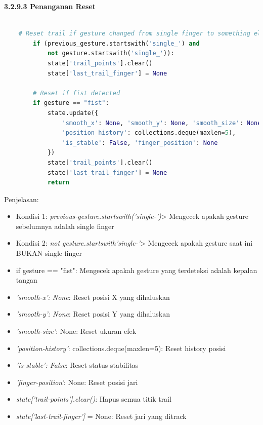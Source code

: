 \documentclass[11pt,a4paper]{article}
\begin{document}
    \noindent\textbf{3.2.9.3 Penanganan Reset}
    \begin{lstlisting}[language=Python, caption=Penanganan Reset]
        
    # Reset trail if gesture changed from single finger to something else
        if (previous_gesture.startswith('single_') and 
            not gesture.startswith('single_')):
            state['trail_points'].clear()
            state['last_trail_finger'] = None
        
        # Reset if fist detected
        if gesture == "fist":
            state.update({
                'smooth_x': None, 'smooth_y': None, 'smooth_size': None,
                'position_history': collections.deque(maxlen=5),
                'is_stable': False, 'finger_position': None
            })
            state['trail_points'].clear()
            state['last_trail_finger'] = None
            return
    \end{lstlisting}
    Penjelasan: 
    \begin{itemize}
        \item Kondisi 1: \textit{previous-gesture.startswith('single-')}> Mengecek apakah gesture sebelumnya adalah single finger
        \item Kondisi 2: \textit{not gesture.startswith'single-'}> Mengecek apakah gesture saat ini BUKAN single finger
        \item if gesture == "fist": Mengecek apakah gesture yang terdeteksi adalah kepalan tangan
        \item \textit{'smooth-x': None}: Reset posisi X yang dihaluskan
        \item \textit{'smooth-y': None}: Reset posisi Y yang dihaluskan
        \item \textit{'smooth-size'}: None: Reset ukuran efek
        \item \textit{'position-history'}: collections.deque(maxlen=5): Reset history posisi
        \item \textit{'is-stable': False}: Reset status stabilitas
        \item \textit{'finger-position'}: None: Reset posisi jari
        \item \textit{state['trail-points'].clear()}: Hapus semua titik trail
        \item \textit{state['last-trail-finger']} = None: Reset jari yang ditrack
    \end{itemize}
\end{document}
